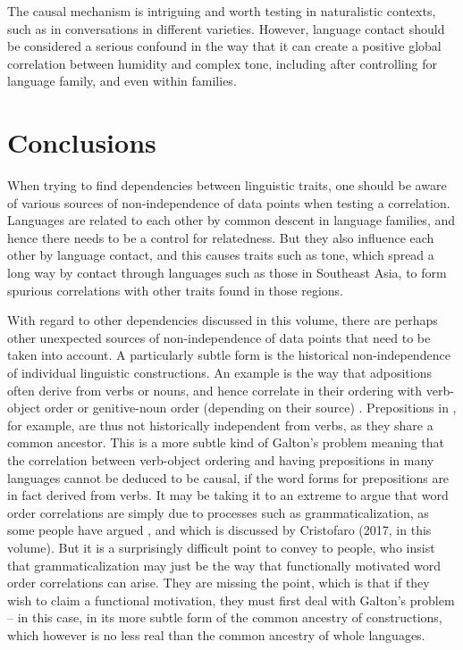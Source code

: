 \documentclass[output=paper]{langsci/langscibook}
\begin{document}
The causal mechanism is
intriguing and worth testing in naturalistic contexts, such as in conversations in different 
varieties.  However, language contact should be considered a serious confound in the way that it can create a positive global correlation between humidity and complex tone, including after controlling for language family, and even within families.



\section{Conclusions}



 When trying to find dependencies between linguistic traits, one should be aware of various sources of non-independence of data points when testing a correlation.  Languages are related to each other by common descent in language families, and hence there needs to be a control for relatedness.  But they also influence each other by language contact, and this causes traits such as tone, which spread a long way by contact through languages such as those in Southeast Asia, to form spurious correlations with other traits found in those regions.  



With regard to other dependencies discussed in this volume, there are perhaps other unexpected sources of non-independence of data points that need to be taken into account.  A particularly subtle form is the historical non-independence of individual linguistic constructions.  An example is the way that adpositions often derive from verbs or nouns, and hence correlate in their ordering with verb-object order or genitive-noun order (depending on their source) \citep{Aristar1991}.  Prepositions in , for example, are thus not historically independent from verbs, as they share a common ancestor.  This is a more subtle kind of Galton’s problem  meaning that the correlation between verb-object ordering and having prepositions in many languages cannot be deduced to be causal, if the word forms for prepositions are in fact derived from verbs.  It may be taking it to an extreme to argue that word order correlations are simply due to processes such as grammaticalization,  as some people have argued \citep{Aristar1991}, and which is discussed by Cristofaro (2017, in this volume).  But it is a surprisingly difficult point to convey to people, who insist that grammaticalization may just be the way that functionally motivated  word order correlations can arise.  They are missing the point, which is that if they wish to claim a functional motivation, they must first deal with Galton’s problem – in this case, in its more subtle form of the common ancestry of constructions, which however is no less real than the common ancestry of whole languages.
\end{document}
